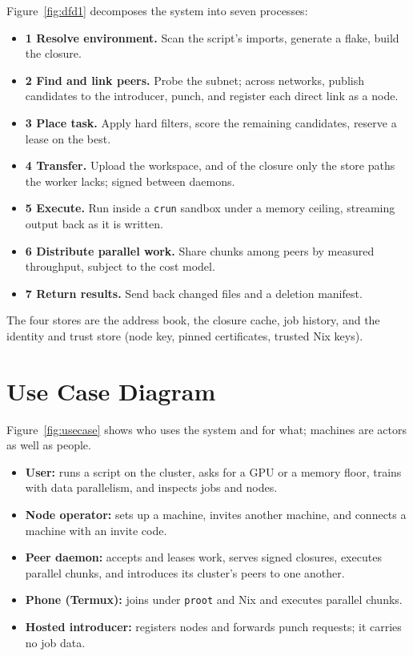 Figure~\ref{fig:dfd1} decomposes the system into seven processes:

\begin{itemize}[leftmargin=*]
  \item \textbf{1 Resolve environment.} Scan the script's imports, generate a
  flake, build the closure.
  \item \textbf{2 Find and link peers.} Probe the subnet; across networks,
  publish candidates to the introducer, punch, and register each direct link as a
  node.
  \item \textbf{3 Place task.} Apply hard filters, score the remaining candidates, reserve
  a lease on the best.
  \item \textbf{4 Transfer.} Upload the workspace, and of the closure only the
  store paths the worker lacks; signed between daemons.
  \item \textbf{5 Execute.} Run inside a \texttt{crun} sandbox under a memory
  ceiling, streaming output back as it is written.
  \item \textbf{6 Distribute parallel work.} Share chunks among peers by
  measured throughput, subject to the cost model.
  \item \textbf{7 Return results.} Send back changed files and a deletion
  manifest.
\end{itemize}

The four stores are the address book, the closure cache, job history, and the
identity and trust store (node key, pinned certificates, trusted Nix keys).

\section{Use Case Diagram}

Figure~\ref{fig:usecase} shows who uses the system and for what; machines are
actors as well as people.

\begin{itemize}[leftmargin=*]
  \item \textbf{User:} runs a script on the cluster, asks for a GPU or a memory
  floor, trains with data parallelism, and inspects jobs and nodes.
  \item \textbf{Node operator:} sets up a machine, invites another machine, and
  connects a machine with an invite code.
  \item \textbf{Peer daemon:} accepts and leases work, serves signed closures,
  executes parallel chunks, and introduces its cluster's peers to one another.
  \item \textbf{Phone (Termux):} joins under \texttt{proot} and Nix and executes
  parallel chunks.
  \item \textbf{Hosted introducer:} registers nodes and forwards punch requests;
  it carries no job data.
\end{itemize}

